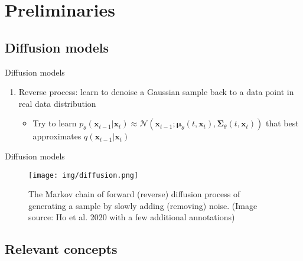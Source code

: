 \section{Preliminaries}
\subsection{Diffusion models}

\begin{frame}{Diffusion models}

\begin{enumerate}

    \begin{itemize}
        \item Sample $\mathbf{x}_0$ in real data distribution and sample $\mathbf{x}_t$ by
        $$q(\mathbf{x}_t|\mathbf{x}_{t-1}) = \mathcal{N}(\mathbf{x}_t; \sqrt{1-\beta_t}\mathbf{x}_{t-1}, \beta_t\mathbf{I}).$$

        \item For a large $T$, $\{x_t\}_{t\ge T}$ is approximate the Gaussian $\mathcal{N}(0,\mathbf{I})$.
    \end{itemize}
    
    
    \item Reverse process: learn to denoise a Gaussian sample back to a data point in real data distribution
    \begin{itemize}
        \item Try to learn $p_\theta(\mathbf{x}_{t-1}|\mathbf{x}_t) \approx \mathcal{N}(\mathbf{x}_{t-1};\bm{\mu}_\theta(t,\mathbf{x}_t),\bm{\Sigma}_\theta(t,\mathbf{x}_t))$ that best approximates $q(\mathbf{x}_{t-1}|\mathbf{x}_t)$
    \end{itemize}
\end{enumerate}


\end{frame}

\begin{frame}{Diffusion models}
\begin{figure}
    \centering
    \texttt{[image: img/diffusion.png]}
    \caption{The Markov chain of forward (reverse) diffusion process of generating a sample by slowly adding (removing) noise. (Image source: Ho et al. 2020 with a few additional annotations)}
    \label{fig:enter-label}
\end{figure}
    
\end{frame}


\subsection{Relevant concepts}

